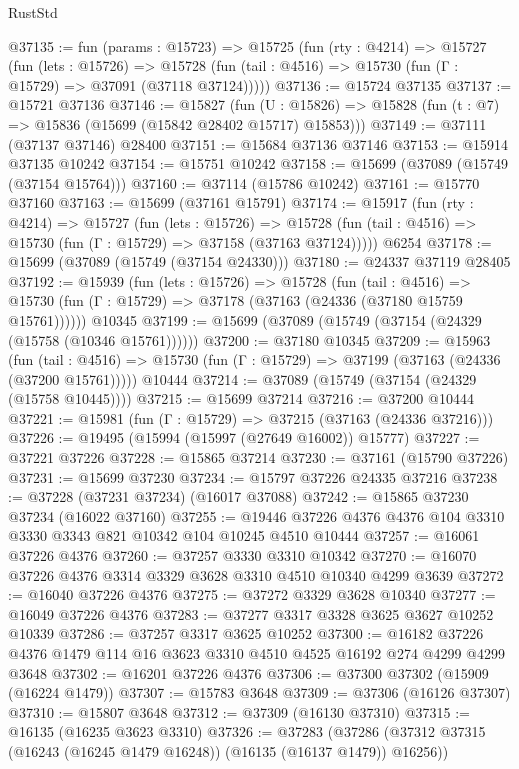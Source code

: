 \begin{lexlean}{RustStd}
\begin{coremodule}
@37135 := fun (params : @15723) =>
  @15725
    (fun (rty : @4214) =>
    @15727
      (fun (lets : @15726) =>
      @15728 (fun (tail : @4516) => @15730 (fun (Γ : @15729) => @37091 (@37118 @37124)))))
@37136 := @15724 @37135
@37137 := @15721 @37136
@37146 := @15827
    (fun (U : @15826) => @15828 (fun (t : @7) => @15836 (@15699 (@15842 @28402 @15717) @15853)))
@37149 := @37111 (@37137 @37146) @28400
@37151 := @15684 @37136 @37146
@37153 := @15914 @37135 @10242
@37154 := @15751 @10242
@37158 := @15699 (@37089 (@15749 (@37154 @15764)))
@37160 := @37114 (@15786 @10242)
@37161 := @15770 @37160
@37163 := @15699 (@37161 @15791)
@37174 := @15917
    (fun (rty : @4214) =>
    @15727
      (fun (lets : @15726) =>
      @15728 (fun (tail : @4516) => @15730 (fun (Γ : @15729) => @37158 (@37163 @37124)))))
    @6254
@37178 := @15699 (@37089 (@15749 (@37154 @24330)))
@37180 := @24337 @37119 @28405
@37192 := @15939
    (fun (lets : @15726) =>
    @15728
      (fun (tail : @4516) =>
      @15730 (fun (Γ : @15729) => @37178 (@37163 (@24336 (@37180 @15759 @15761))))))
    @10345
@37199 := @15699 (@37089 (@15749 (@37154 (@24329 (@15758 (@10346 @15761))))))
@37200 := @37180 @10345
@37209 := @15963
    (fun (tail : @4516) => @15730 (fun (Γ : @15729) => @37199 (@37163 (@24336 (@37200 @15761)))))
    @10444
@37214 := @37089 (@15749 (@37154 (@24329 (@15758 @10445))))
@37215 := @15699 @37214
@37216 := @37200 @10444
@37221 := @15981 (fun (Γ : @15729) => @37215 (@37163 (@24336 @37216)))
@37226 := @19495 (@15994 (@15997 (@27649 @16002)) @15777)
@37227 := @37221 @37226
@37228 := @15865 @37214
@37230 := @37161 (@15790 @37226)
@37231 := @15699 @37230
@37234 := @15797 @37226 @24335 @37216
@37238 := @37228 (@37231 @37234) (@16017 @37088)
@37242 := @15865 @37230 @37234 (@16022 @37160)
@37255 := @19446 @37226 @4376 @4376 @104 @3310 @3330 @3343 @821 @10342 @104 @10245 @4510 @10444
@37257 := @16061 @37226 @4376
@37260 := @37257 @3330 @3310 @10342
@37270 := @16070 @37226 @4376 @3314 @3329 @3628 @3310 @4510 @10340 @4299 @3639
@37272 := @16040 @37226 @4376
@37275 := @37272 @3329 @3628 @10340
@37277 := @16049 @37226 @4376
@37283 := @37277 @3317 @3328 @3625 @3627 @10252 @10339
@37286 := @37257 @3317 @3625 @10252
@37300 := @16182 @37226 @4376 @1479 @114 @16 @3623 @3310 @4510 @4525 @16192 @274 @4299 @4299 @3648
@37302 := @16201 @37226 @4376
@37306 := @37300 @37302 (@15909 (@16224 @1479))
@37307 := @15783 @3648
@37309 := @37306 (@16126 @37307)
@37310 := @15807 @3648
@37312 := @37309 (@16130 @37310)
@37315 := @16135 (@16235 @3623 @3310)
@37326 := @37283
    (@37286 (@37312 @37315 (@16243 (@16245 @1479 @16248)) (@16135 (@16137 @1479)) @16256))

\end{coremodule}
\end{lexlean}
